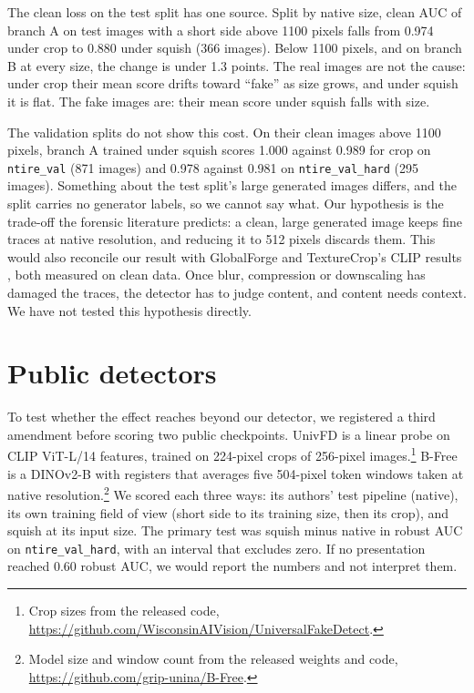 \documentclass[letterpaper]{article} %
\begin{document}
The clean loss on the test split has one source. Split by native size, clean
AUC of branch A on test images with a short side above 1100 pixels falls from
0.974 under crop to 0.880 under squish (366 images). Below 1100 pixels, and on
branch B at every size, the change is under 1.3 points. The real images are not
the cause: under crop their mean score drifts toward ``fake'' as size grows,
and under squish it is flat. The fake images are: their mean score under
squish falls with size.

The validation splits do not show this cost. On their clean images above
1100 pixels, branch A trained under squish scores 1.000 against 0.989 for
crop on \texttt{ntire\_val} (871 images) and 0.978 against 0.981 on
\texttt{ntire\_val\_hard} (295 images). Something about the test split's large
generated images differs, and the split carries no generator labels, so we
cannot say what. Our hypothesis is the trade-off the forensic literature
predicts: a clean, large generated image keeps fine traces at native
resolution, and reducing it to 512 pixels discards them. This would also
reconcile our result with GlobalForge \cite{cui2026globalforge} and
TextureCrop's CLIP results \cite{konstantinidou2025texturecrop}, both measured
on clean data. Once blur, compression or downscaling has damaged the traces,
the detector has to judge content, and content needs context. We have not
tested this hypothesis directly.

\section{Public detectors}
\label{sec:public}

To test whether the effect reaches beyond our detector, we registered a third
amendment before scoring two public checkpoints. UnivFD \cite{ojha2023univfd}
is a linear probe on CLIP ViT-L/14 features, trained on 224-pixel crops of
256-pixel images.\footnote{Crop sizes from the released code,
\url{https://github.com/WisconsinAIVision/UniversalFakeDetect}.} B-Free
\cite{guillaro2025bfree} is a DINOv2-B with registers that averages five
504-pixel token windows taken at native resolution.\footnote{Model size and
window count from the released weights and code,
\url{https://github.com/grip-unina/B-Free}.} We scored each three ways: its authors' test pipeline (native),
its own training field of view (short side to its training size, then its
crop), and squish at its input size. The primary test was squish minus native
in robust AUC on \texttt{ntire\_val\_hard}, with an interval that excludes
zero. If no presentation reached 0.60 robust AUC, we would report the numbers
and not interpret them.
\end{document}
